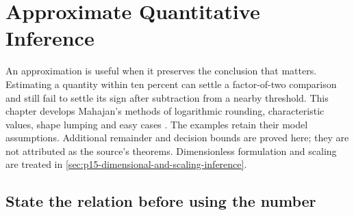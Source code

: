 \chapter{Approximate Quantitative Inference}
\label{sec:p15-approximate-quantitative-inference}

An approximation is useful when it preserves the conclusion that matters.
Estimating a quantity within ten percent can settle a factor-of-two comparison
and still fail to settle its sign after subtraction from a nearby threshold.
This chapter develops Mahajan's methods of logarithmic rounding, characteristic
values, shape lumping and easy cases
\cite[Secs.~6.1--6.4, 8.1--8.4]{Mahajan2014Insight}.
The examples retain their model assumptions. Additional remainder and decision
bounds are proved here; they are not attributed as the source's theorems.
Dimensionless formulation and scaling are treated in
\cref{sec:p15-dimensional-and-scaling-inference}.

\section{State the relation before using the number}

